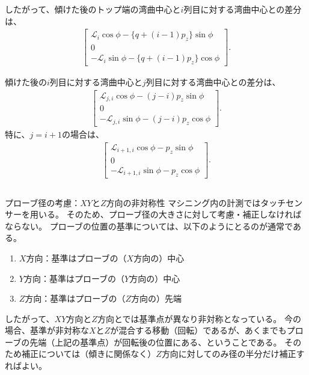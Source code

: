 したがって、傾けた後のトップ端の湾曲中心と$i$列目に対する湾曲中心との差分は、
\begin{align*}
  \left[
  \begin{array}{c}
    \mathcal L_i\cos\phi-\{q+(i-1)p_z\}\sin\phi\\
    0\\
    -\mathcal L_i\sin\phi-\{q+(i-1)p_z\}\cos\phi
  \end{array}
  \right].
\end{align*}
\begin{hosokubox}
傾けた後の$i$列目に対する湾曲中心と$j$列目に対する湾曲中心との差分は、
\begin{align*}
  \left[
  \begin{array}{c}
    \mathcal L_{j,i}\cos\phi-(j-i)p_z\sin\phi\\
    0\\
    -\mathcal L_{j,i}\sin\phi-(j-i)p_z\cos\phi
  \end{array}
  \right].
\end{align*}
特に、$j = i+1$の場合は、
\begin{align*}
  \left[
  \begin{array}{c}
    \mathcal L_{i+1,i}\cos\phi-p_z\sin\phi\\
    0\\
    -\mathcal L_{i+1,i}\sin\phi-p_z\cos\phi
  \end{array}
  \right].
\end{align*}
\end{hosokubox}
\begin{Column}{プローブ径の考慮：$XY$と$Z$方向の非対称性}
マシニング内の計測ではタッチセンサーを用いる。
そのため、プローブ径の大きさに対して考慮・補正しなければならない。
プローブの位置の基準については、以下のようにとるのが通常である。
\begin{enumerate}
\item $X$方向：基準はプローブの（$X$方向の）中心
\item $Y$方向：基準はプローブの（$Y$方向の）中心
\item $Z$方向：基準はプローブの（$Z$方向の）先端
\end{enumerate}
したがって、$XY$方向と$Z$方向とでは基準点が異なり非対称となっている。
今の場合、基準が非対称な$X$と$Z$が混合する移動（回転）であるが、あくまでもプローブの先端（上記の基準点）が回転後の位置にある、ということである。
そのため補正については（傾きに関係なく）$Z$方向に対してのみ径の半分だけ補正すればよい。
\end{Column}




